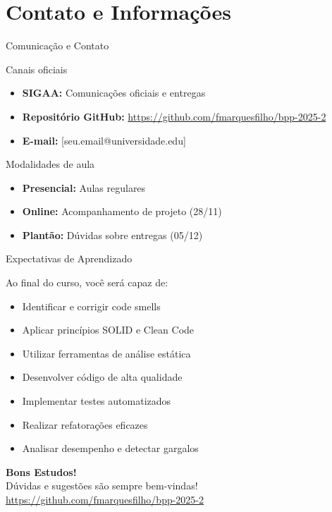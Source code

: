 \documentclass[10pt, aspectratio=169]{beamer}
\begin{document}
\section{Contato e Informações}
\begin{frame}{Comunicação e Contato}
\begin{block}{Canais oficiais}
\begin{itemize}
    \item \textbf{SIGAA:} Comunicações oficiais e entregas
    \item \textbf{Repositório GitHub:} \url{https://github.com/fmarquesfilho/bpp-2025-2}
    \item \textbf{E-mail:} [seu.email@universidade.edu]
\end{itemize}
\end{block}

\begin{block}{Modalidades de aula}
\begin{itemize}
    \item \textbf{Presencial:} Aulas regulares
    \item \textbf{Online:} Acompanhamento de projeto (28/11)
    \item \textbf{Plantão:} Dúvidas sobre entregas (05/12)
\end{itemize}
\end{block}
\end{frame}

\begin{frame}{Expectativas de Aprendizado}
\begin{block}{Ao final do curso, você será capaz de:}
\begin{itemize}
    \item Identificar e corrigir code smells
    \item Aplicar princípios SOLID e Clean Code
    \item Utilizar ferramentas de análise estática
    \item Desenvolver código de alta qualidade
    \item Implementar testes automatizados
    \item Realizar refatorações eficazes
    \item Analisar desempenho e detectar gargalos
\end{itemize}
\end{block}
\end{frame}

\begin{frame}
\centering
\Huge \textbf{Bons Estudos!}
\vspace{1cm}
\\
\large Dúvidas e sugestões são sempre bem-vindas!
\\
\vspace{0.5cm}
\small \url{https://github.com/fmarquesfilho/bpp-2025-2}
\end{frame}
\end{document}
